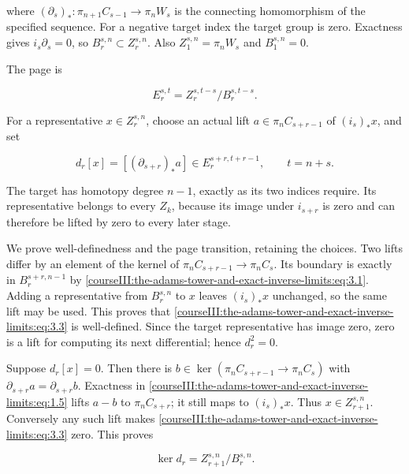 where \((\partial_s)_*:\pi_{n+1}C_{s-1}\to\pi_nW_s\) is the connecting homomorphism of the specified sequence. For a negative target index the target group is zero. Exactness gives \(i_s\partial_s=0\), so \(B_r^{s,n}\subset Z_r^{s,n}\). Also \(Z_1^{s,n}=\pi_nW_s\) and \(B_1^{s,n}=0\).

The page is

\begin{equation}
E_r^{s,t}=Z_r^{s,t-s}/B_r^{s,t-s}.
 \label{courseIII:the-adams-tower-and-exact-inverse-limits:eq:3.2}
\end{equation}

For a representative \(x\in Z_r^{s,n}\), choose an actual lift
\(a\in\pi_n C_{s+r-1}\) of \((i_s)_*x\), and set

\begin{equation}
d_r[x]=[(\partial_{s+r})_*a]
      \in E_r^{s+r,t+r-1},\qquad t=n+s.
 \label{courseIII:the-adams-tower-and-exact-inverse-limits:eq:3.3}
\end{equation}

The target has homotopy degree \(n-1\), exactly as its two indices require. Its representative belongs to every \(Z_k\), because its image under \(i_{s+r}\) is zero and can therefore be lifted by zero to every later stage.

We prove well-definedness and the page transition, retaining the choices. Two lifts differ by an element of the kernel of
\(\pi_nC_{s+r-1}\to\pi_nC_s\).
Its boundary is exactly in \(B_r^{s+r,n-1}\) by \eqref{courseIII:the-adams-tower-and-exact-inverse-limits:eq:3.1}. Adding a representative from \(B_r^{s,n}\) to \(x\) leaves \((i_s)_*x\) unchanged, so the same lift may be used. This proves that \eqref{courseIII:the-adams-tower-and-exact-inverse-limits:eq:3.3} is well-defined. Since the target representative has image zero, zero is a lift for computing its next differential; hence \(d_r^2=0\).

Suppose \(d_r[x]=0\). Then there is
\(b\in\ker(\pi_nC_{s+r-1}\to\pi_nC_s)\)
with \(\partial_{s+r}a=\partial_{s+r}b\). Exactness in \eqref{courseIII:the-adams-tower-and-exact-inverse-limits:eq:1.5} lifts \(a-b\) to \(\pi_nC_{s+r}\); it still maps to \((i_s)_*x\). Thus \(x\in Z_{r+1}^{s,n}\). Conversely any such lift makes \eqref{courseIII:the-adams-tower-and-exact-inverse-limits:eq:3.3} zero. This proves

\begin{equation}
\ker d_r=Z_{r+1}^{s,n}/B_r^{s,n}.
 \label{courseIII:the-adams-tower-and-exact-inverse-limits:eq:3.4}
\end{equation}

